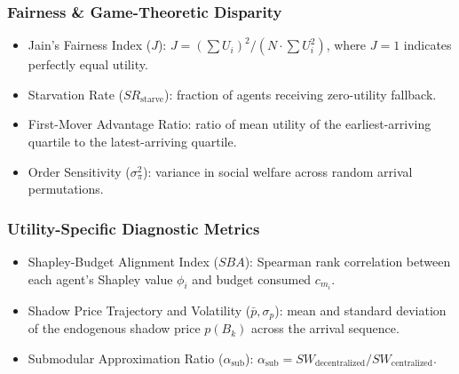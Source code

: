 \documentclass{article}
\begin{document}
\subsubsection*{Fairness \& Game-Theoretic Disparity}
\begin{itemize}[leftmargin=*] 
    \item Jain's Fairness Index ($J$): $J = \left(\sum U_i\right)^2 / \left(N \cdot \sum U_i^2\right)$, where $J = 1$ indicates perfectly equal utility.
    \item Starvation Rate ($SR_{\text{starve}}$): fraction of agents receiving zero-utility fallback.
    \item First-Mover Advantage Ratio: ratio of mean utility of the earliest-arriving quartile to the latest-arriving quartile.
    \item Order Sensitivity ($\sigma^2_{\pi}$): variance in social welfare across random arrival permutations.
\end{itemize}

\subsubsection*{Utility-Specific Diagnostic Metrics}
\begin{itemize}[leftmargin=*] 
    \item Shapley-Budget Alignment Index ($SBA$): Spearman rank correlation between each agent's Shapley value $\phi_i$ and budget consumed $c_{m_i}$.
    \item Shadow Price Trajectory and Volatility ($\bar{p}, \sigma_p$): mean and standard deviation of the endogenous shadow price $p(B_k)$ across the arrival sequence.
    \item Submodular Approximation Ratio ($\alpha_{\mathrm{sub}}$): $\alpha_{\mathrm{sub}} = SW_{\mathrm{decentralized}} / SW_{\mathrm{centralized}}$.
\end{itemize}

\end{document}
